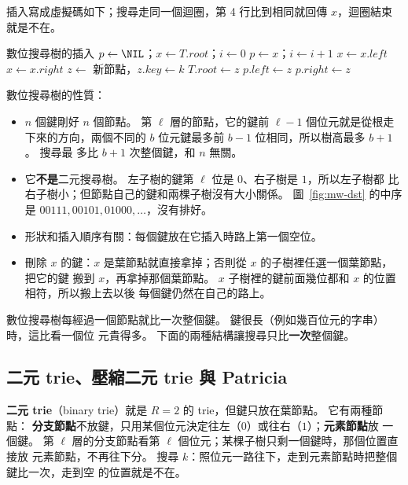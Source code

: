 插入寫成虛擬碼如下；搜尋走同一個迴圈，第 4 行比到相同就回傳 $x$，迴圈結束就是不在。

\begin{pseudo}[label=alg:mw-dst, unbreakable]{數位搜尋樹的插入}
    \State $p \gets \NIL$；$x \gets T.\mathit{root}$；$i \gets 0$
            \State \Return {}
        \EndIf
        \State $p \gets x$；$i \gets i + 1$
            \State $x \gets x.\mathit{left}$
        \Else
            \State $x \gets x.\mathit{right}$
        \EndIf
    \EndWhile
    \State $z \gets$ 新節點，$z.\mathit{key} \gets k$
        \State $T.\mathit{root} \gets z$
        \State $p.\mathit{left} \gets z$
    \Else
        \State $p.\mathit{right} \gets z$
    \EndIf
\EndProcedure
\end{pseudo}

數位搜尋樹的性質：
\begin{itemize}
\item $n$ 個鍵剛好 $n$ 個節點。 第 $\ell$ 層的節點，它的鍵前 $\ell - 1$ 個位元就是從根走
下來的方向，兩個不同的 $b$ 位元鍵最多前 $b - 1$ 位相同，所以樹高最多 $b + 1$。 搜尋最
多比 $b + 1$ 次整個鍵，和 $n$ 無關。
\item 它\textbf{不是}二元搜尋樹。 左子樹的鍵第 $\ell$ 位是 $0$、右子樹是 $1$，所以左子樹都
比右子樹小；但節點自己的鍵和兩棵子樹沒有大小關係。 圖~\ref{fig:mw-dst} 的中序是
$00111, 00101, 01000, \ldots$，沒有排好。
\item 形狀和插入順序有關：每個鍵放在它插入時路上第一個空位。
\item 刪除 $x$ 的鍵：$x$ 是葉節點就直接拿掉；否則從 $x$ 的子樹裡任選一個葉節點，把它的鍵
搬到 $x$，再拿掉那個葉節點。 $x$ 子樹裡的鍵前面幾位都和 $x$ 的位置相符，所以搬上去以後
每個鍵仍然在自己的路上。
\end{itemize}

數位搜尋樹每經過一個節點就比一次整個鍵。 鍵很長（例如幾百位元的字串）時，這比看一個位
元貴得多。 下面的兩種結構讓搜尋只比\textbf{一次}整個鍵。

\subsection{二元 trie、壓縮二元 trie 與 Patricia}
\label{sec:mw-patricia}

\textbf{二元 trie}（binary trie）就是 $R = 2$ 的 trie，但鍵只放在葉節點。 它有兩種節點：
\textbf{分支節點}不放鍵，只用某個位元決定往左（$0$）或往右（$1$）；\textbf{元素節點}放
一個鍵。 第 $\ell$ 層的分支節點看第 $\ell$ 個位元；某棵子樹只剩一個鍵時，那個位置直接放
元素節點，不再往下分。 搜尋 $k$：照位元一路往下，走到元素節點時把整個鍵比一次，走到空
的位置就是不在。

